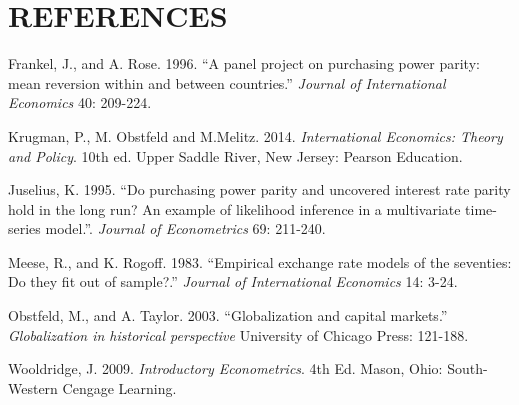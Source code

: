 \documentclass{sig-alternate-05-2015}
\begin{document}
\section*{REFERENCES}
\begin{hangref}

\item Frankel, J., and A. Rose. 1996.
``A panel project on purchasing power parity: mean reversion within and between countries.''
{\it Journal of International Economics} 40: 209-224.

\item Krugman, P., M. Obstfeld and M.Melitz.  2014.
{\it International Economics: Theory and Policy}. 10th ed.
Upper Saddle River, New Jersey: Pearson Education.

\item Juselius, K. 1995.
``Do purchasing power parity and uncovered interest rate parity hold in the long run? An example of likelihood inference in a multivariate time-series model.''.
{\it Journal of Econometrics} 69: 211-240.

\item Meese, R., and K. Rogoff. 1983.
``Empirical exchange rate models of the seventies: Do they fit out of sample?.'' 
{\it Journal of International Economics} 14: 3-24.

\item Obstfeld, M., and A. Taylor. 2003.
``Globalization and capital markets.'' 
{\it Globalization in historical perspective}
University of Chicago Press: 121-188.

\item Wooldridge, J. 2009.
{\it Introductory Econometrics}. 4th Ed.
Mason, Ohio: South-Western Cengage Learning.





\end{hangref}

\clearpage
\end{document}
